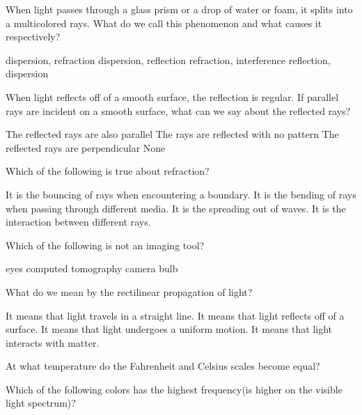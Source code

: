 \documentclass[12pt,addpoints]{exam}
\begin{document}
{{{\begin{questions}
					\question When light passes through a glass prism or a drop of water or foam, it splits into a multicolored rays. What do we call this phenomenon and what causes it respectively? \\
					\begin{oneparchoices}
						\choice dispersion, refraction
						\choice dispersion, reflection
						\choice refraction, interference 
						\choice reflection, dispersion
					\end{oneparchoices}
					\question When light reflects off of a smooth surface, the reflection is regular. If parallel rays are incident on a smooth surface, what can we say about the reflected rays?
					\begin{choices}
						\choice The reflected rays are also parallel
						\choice The rays are reflected with no pattern
						\choice The reflected rays are perpendicular
						\choice None
					\end{choices}
					\question Which of the following is true about refraction?
					\begin{choices}
						\choice It is the bouncing of rays when encountering a boundary.
						\choice It is the bending of rays when passing through different media.
						\choice It is the spreading out of waves.
						\choice It is the interaction between different rays.
					\end{choices}
					\question Which of the following is not an imaging tool? \\
					\begin{oneparchoices}
						\choice eyes
						\choice computed tomography
						\choice camera
						\choice bulb
					\end{oneparchoices}
					\question What do we mean by the rectilinear propagation of light?
					\begin{choices}
						\choice It means that light travels in a straight line.
						\choice It means that light reflects off of a surface.
						\choice It means that light undergoes a uniform motion.
						\choice It means that light interacts with matter.
					\end{choices}
					\question At what temperature do the Fahrenheit and Celsius scales become equal? \\
					\begin{oneparchoices}
						\choice -60
						\choice 60
						\choice -40
						\choice 40
					\end{oneparchoices}
					\question Which of the following colors has the highest frequency(is higher on the visible light spectrum)? \\

\end{questions}}}}
\end{document}
